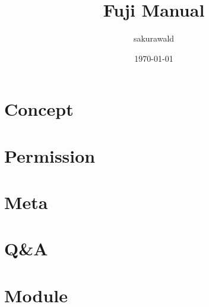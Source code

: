 \documentclass[10pt,oneside]{book}
\begin{document}
    \title{Fuji Manual}
    \author{sakurawald}
    \date{\today\\\version}

    \maketitle
    \tableofcontents


    \mainmatter


    \chapter{Concept}\label{ch:concept}
    


    \chapter{Permission}\label{ch:permission}
    


    \chapter{Meta}\label{ch:meta}
    


    \chapter{Q\&A}\label{ch:q&a}
    


    \chapter{Module}\label{ch:module}
    
\end{document}
